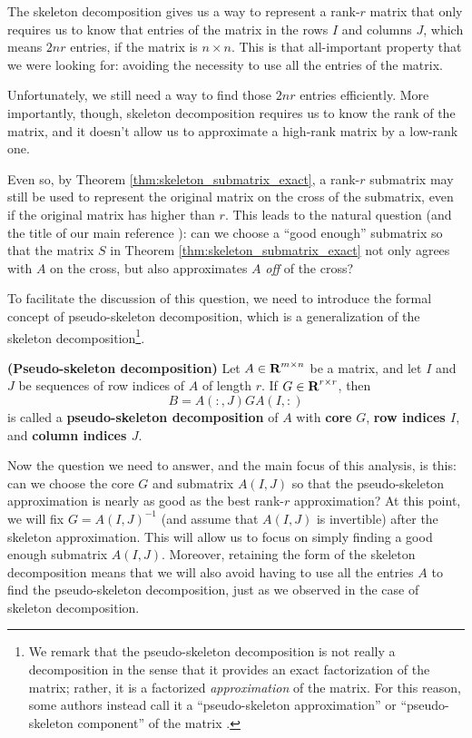 \documentclass{article}
\begin{document}
	
	
	The skeleton decomposition gives us a way to represent a rank-$r$ matrix that only requires us to know that entries of the matrix in the rows $I$ and columns $J$, which means $2nr$ entries, if the matrix is $n\times n$. This is that all-important property that we were looking for: avoiding the necessity to use all the entries of the matrix.
	
	Unfortunately, we still need a way to find those $2nr$ entries efficiently. More importantly, though, skeleton decomposition requires us to know the rank of the matrix, and it doesn't allow us to approximate a high-rank matrix by a low-rank one.
	
	Even so, by Theorem \ref{thm:skeleton_submatrix_exact}, a rank-$r$ submatrix may still be used to represent the original matrix on the cross of the submatrix, even if the original matrix has higher than $r$. This leads to the natural question (and the title of our main reference \cite{goreinov_2010}): can we choose a ``good enough'' submatrix so that the matrix $S$ in Theorem \ref{thm:skeleton_submatrix_exact} not only agrees with $A$ on the cross, but also approximates $A$ \textit{off} of the cross?
	
	To facilitate the discussion of this question, we need to introduce the formal concept of pseudo-skeleton decomposition, which is a generalization of the skeleton decomposition\footnote{We remark that the pseudo-skeleton decomposition is not really a decomposition in the sense that it provides an exact factorization of the matrix; rather, it is a factorized \textit{approximation} of the matrix. For this reason, some authors instead call it a ``pseudo-skeleton approximation'' or ``pseudo-skeleton component'' of the matrix \cite{goreinov_1997, oseledets_2010a}.}.
	
	\begin{dfn} \textnormal{\bf(Pseudo-skeleton decomposition)}
		Let $A \in \textnormal{\bf R}^{m\times n}$ be a matrix, and let $I$ and $J$ be sequences of row indices of $A$ of length $r$. If $G \in \textnormal{\bf R}^{r\times r}$, then
		\begin{equation}
			B = A(:, J) G A(I,:)
		\end{equation}
		is called a \textbf{pseudo-skeleton decomposition} of $A$ with \textbf{core} $G$, \textbf{row indices $I$}, and \textbf{column indices $J$}.
	\end{dfn}
	
	Now the question we need to answer, and the main focus of this analysis, is this: can we choose the core $G$ and submatrix $A(I,J)$ so that the pseudo-skeleton approximation is nearly as good as the best rank-$r$ approximation? At this point, we will fix $G = A(I,J)^{-1}$ (and assume that $A(I,J)$ is invertible) after the skeleton approximation. This will allow us to focus on simply finding a good enough submatrix $A(I,J)$. Moreover, retaining the form of the skeleton decomposition means that we will also avoid having to use all the entries $A$ to find the pseudo-skeleton decomposition, just as we observed in the case of skeleton decomposition.
	
\end{document}
